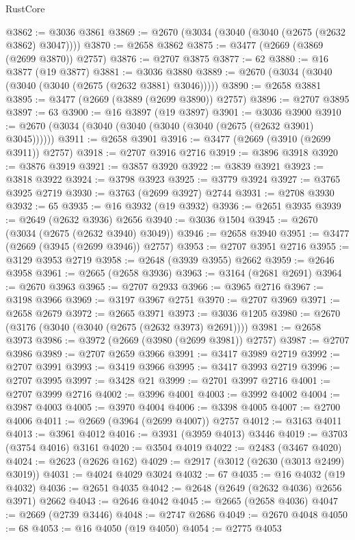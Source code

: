 \begin{lexlean}{RustCore}
\begin{coremodule}
@3862 := @3036 @3861
@3869 := @2670 (@3034 (@3040 (@3040 (@2675 (@2632 @3862) @3047))))
@3870 := @2658 @3862
@3875 := @3477 (@2669 (@3869 (@2699 @3870)) @2757)
@3876 := @2707 @3875
@3877 := 62
@3880 := @16 @3877 (@19 @3877)
@3881 := @3036 @3880
@3889 := @2670 (@3034 (@3040 (@3040 (@3040 (@2675 (@2632 @3881) @3046)))))
@3890 := @2658 @3881
@3895 := @3477 (@2669 (@3889 (@2699 @3890)) @2757)
@3896 := @2707 @3895
@3897 := 63
@3900 := @16 @3897 (@19 @3897)
@3901 := @3036 @3900
@3910 := @2670 (@3034 (@3040 (@3040 (@3040 (@3040 (@2675 (@2632 @3901) @3045))))))
@3911 := @2658 @3901
@3916 := @3477 (@2669 (@3910 (@2699 @3911)) @2757)
@3918 := @2707 @3916 @2716
@3919 := @3896 @3918
@3920 := @3876 @3919
@3921 := @3857 @3920
@3922 := @3839 @3921
@3923 := @3818 @3922
@3924 := @3798 @3923
@3925 := @3779 @3924
@3927 := @3765 @3925 @2719
@3930 := @3763 (@2699 @3927) @2744
@3931 := @2708 @3930
@3932 := 65
@3935 := @16 @3932 (@19 @3932)
@3936 := @2651 @3935
@3939 := @2649 (@2632 @3936) @2656
@3940 := @3036 @1504
@3945 := @2670 (@3034 (@2675 (@2632 @3940) @3049))
@3946 := @2658 @3940
@3951 := @3477 (@2669 (@3945 (@2699 @3946)) @2757)
@3953 := @2707 @3951 @2716
@3955 := @3129 @3953 @2719
@3958 := @2648 (@3939 @3955) @2662
@3959 := @2646 @3958
@3961 := @2665 (@2658 @3936)
@3963 := @3164 (@2681 @2691)
@3964 := @2670 @3963
@3965 := @2707 @2933
@3966 := @3965 @2716
@3967 := @3198 @3966
@3969 := @3197 @3967 @2751
@3970 := @2707 @3969
@3971 := @2658 @2679
@3972 := @2665 @3971
@3973 := @3036 @1205
@3980 := @2670 (@3176 (@3040 (@3040 (@2675 (@2632 @3973) @2691))))
@3981 := @2658 @3973
@3986 := @3972 (@2669 (@3980 (@2699 @3981)) @2757)
@3987 := @2707 @3986
@3989 := @2707 @2659 @3966
@3991 := @3417 @3989 @2719
@3992 := @2707 @3991
@3993 := @3419 @3966
@3995 := @3417 @3993 @2719
@3996 := @2707 @3995
@3997 := @3428 @21
@3999 := @2701 @3997 @2716
@4001 := @2707 @3999 @2716
@4002 := @3996 @4001
@4003 := @3992 @4002
@4004 := @3987 @4003
@4005 := @3970 @4004
@4006 := @3398 @4005
@4007 := @2700 @4006
@4011 := @2669 (@3964 (@2699 @4007)) @2757
@4012 := @3163 @4011
@4013 := @3961 @4012
@4016 := @3931 (@3959 @4013) @3446
@4019 := @3703 (@3754 @4016) @3161
@4020 := @3504 @4019
@4022 := @2483 (@3467 @4020)
@4024 := @2623 (@2626 @162)
@4029 := @2917 (@3012 (@2630 (@3013 @2499) @3019))
@4031 := @4024 @4029 @3024
@4032 := 67
@4035 := @16 @4032 (@19 @4032)
@4036 := @2651 @4035
@4042 := @2648 (@2649 (@2632 @4036) @2656 @3971) @2662
@4043 := @2646 @4042
@4045 := @2665 (@2658 @4036)
@4047 := @2669 (@2739 @3446)
@4048 := @2747 @2686
@4049 := @2670 @4048
@4050 := 68
@4053 := @16 @4050 (@19 @4050)
@4054 := @2775 @4053

\end{coremodule}
\end{lexlean}

